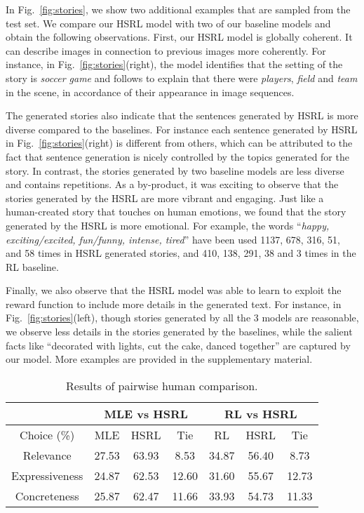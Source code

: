 \documentclass[letterpaper]{article} \usepackage{aaai19}  \usepackage{times}  \usepackage{helvet}  \usepackage{courier}  \usepackage{url}  \usepackage{graphicx}
\begin{document}
In Fig.~\ref{fig:stories}, we show two additional examples that are sampled from the test set. We compare our HSRL model with two of our baseline models and obtain the following observations. First, our HSRL model is globally coherent. It can describe images in connection to previous images more coherently. For instance, in Fig.~\ref{fig:stories}(right), the model identifies that the setting of the story is \textit{soccer game} and follows to explain that there were \textit{players}, \textit{field} and \textit{team} in the scene, in accordance of their appearance in image sequences.

The generated stories also indicate that the sentences generated by HSRL is more diverse compared to the baselines. 
For instance each sentence generated by HSRL in Fig.~\ref{fig:stories}(right) is different from others, which can be attributed to the fact that sentence generation is nicely controlled by the topics generated for the story. In contrast, the stories generated by two baseline models are less diverse and contains repetitions. As a by-product, it was exciting to observe that the stories generated by the HSRL are more vibrant and engaging. Just like a human-created story that touches on human emotions, we found that the story generated by the HSRL is more emotional. For example, the words ``\textit{happy, exciting/excited, fun/funny, intense, tired}'' have been used 1137, 678, 316, 51, and 58 times in HSRL generated stories, and 410, 138, 291, 38 and 3 times in the RL baseline. 


Finally, we also observe that the HSRL model was able to learn to exploit the reward function to include more details in the generated text. For instance, in Fig.~\ref{fig:stories}(left), though stories generated by all the 3 models are reasonable, we observe less details in the stories generated by the baselines, while the salient facts like ``decorated with lights, cut the cake, danced together'' are captured by our model. More examples are provided in the supplementary material.

\begin{table}[t!]
	\centering
	\caption{\small Results of pairwise human comparison. }
\label{tbl:human_pair}
	\scriptsize
\begin{tabular}{c|ccc|ccc}
		\hline
		& \multicolumn{3}{c|}{MLE vs HSRL} & \multicolumn{3}{c}{RL vs HSRL} \\
		\hline
		Choice (\%) & MLE & HSRL & Tie & RL & HSRL & Tie \\
		\hline
		Relevance & 27.53 & 63.93 & 8.53 & 34.87 & 56.40 & 8.73 \\ 
		Expressiveness & 24.87 & 62.53 & 12.60 & 31.60 & 55.67 & 12.73 \\ 
		Concreteness & 25.87 & 62.47 & 11.66 & 33.93 & 54.73 & 11.33 \\
		\hline
	\end{tabular}
\end{table} 
\end{document}
